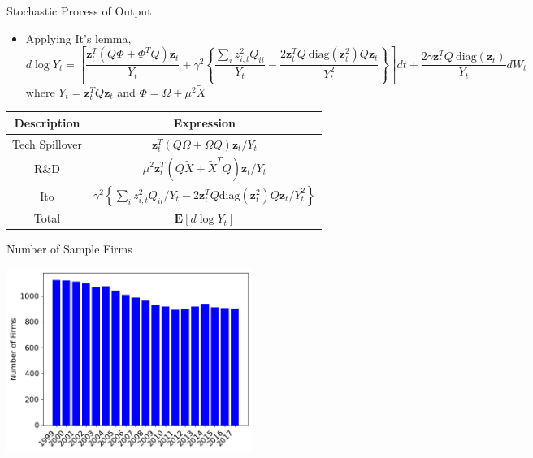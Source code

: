 \documentclass[
  10pt, %
  aspectratio=169,  %
  handout
]{beamer}
\theoremstyle{plain}
\begin{document}
\begin{frame}{Stochastic Process of Output}

  \label{Y_process}
  \begin{itemize}
    \item Applying It's lemma, {\footnotesize
          \[
            d\log Y_{t}=\left[\frac{\boldsymbol{z}_{t}^{T}\left(Q\Phi+\Phi^{T}Q\right)\boldsymbol{z}_{t}}{Y_{t}}+\gamma^{2}\left\{ \frac{\sum_{i}z_{i,t}^{2}Q_{ii}}{Y_{t}}-\frac{2\boldsymbol{z}_{t}^{T}Q\ \text{diag}\left(\boldsymbol{z}_{t}^{2}\right)Q\boldsymbol{z}_{t}}{Y_{t}^{2}}\right\} \right]dt+\frac{2\gamma\boldsymbol{z}_{t}^{T}Q\ \text{diag}\left(\boldsymbol{z}_{t}\right)}{Y_{t}}dW_{t}
          \]
          }where $Y_{t}=\boldsymbol{z}_{t}^{T}Q\boldsymbol{z}_{t}$ and $\Phi=\Omega+\mu^{2}\widetilde{X}$
  \end{itemize}
  \begin{center}
    \begin{tabular}{cc}
      \hline
      \hline Description & Expression\tabularnewline
      \hline
      Tech Spillover     & $\boldsymbol{z}_{t}^{T}\left(Q\Omega+\Omega Q\right)\boldsymbol{z}_{t}/Y_{t}$\tabularnewline
      R\&D               & $\mu^{2}\boldsymbol{z}_{t}^{T}\left(Q\widetilde{X}+\widetilde{X}^{T}Q\right)\boldsymbol{z}_{t}/Y_{t}$\tabularnewline
      Ito                & $\gamma^{2}\left\{ \sum_{i}z_{i,t}^{2}Q_{ii}/Y_{t}-2\boldsymbol{z}_{t}^{T}Q\text{diag}\left(\boldsymbol{z}_{t}^{2}\right)Q\boldsymbol{z}_{t}/Y_{t}^{2}\right\} $\tabularnewline
      \hline
      Total              & $\boldsymbol{E}\left[d\log Y_{t}\right]$\tabularnewline
      \hline
    \end{tabular}
    \par\end{center}
\end{frame}
%
\begin{frame}{Number of Sample Firms}
  \begin{center}
    \includegraphics[width=8cm]{figures/number_of_firm}
    \par\end{center}

\end{frame}
\end{document}
